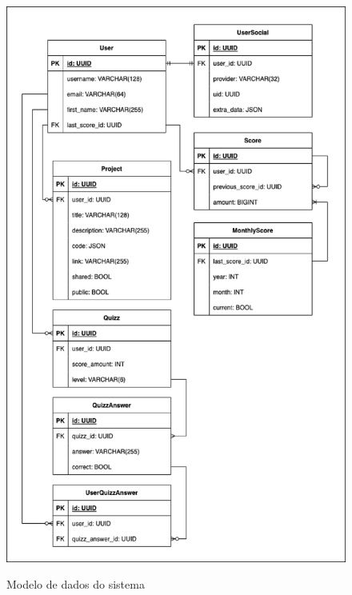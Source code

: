 \begin{figure}[h!]
    \centering
    \caption{Modelo de dados do sistema}
    \includegraphics[keepaspectratio=true,scale=0.6]{figuras/modelo_de_dados.eps}
    \label{fig:modelo_dados}
\end{figure}
